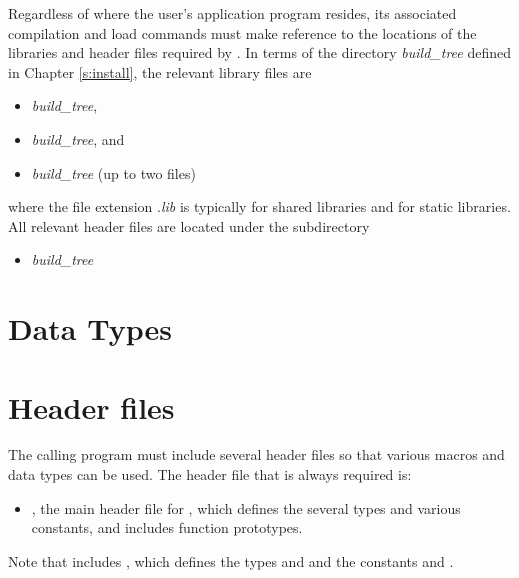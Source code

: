 Regardless of where the user's application program resides, its
associated compilation and load commands must make reference to the
locations of the libraries and header files required by
{\cvodes}.  In terms of the directory {\em build\_tree} defined in
Chapter \ref{s:install}, the relevant library files are
\begin{itemize}
\item {\em build\_tree},
\item {\em build\_tree}, and
\item {\em build\_tree} (up to two files)
\end{itemize}
where the file extension .{\em lib} is typically  for shared libraries
and  for static libraries. All relevant header files are located under
the subdirectory
\begin{itemize}
\item {\em build\_tree}
\end{itemize}

\section{Data Types}\label{s:types}


\section{Header files}\label{ss:header_sim}
The calling program must include several header files so that various macros
and data types can be used. The header file that is always required is:
\begin{itemize}
\item  {}, 
  the main header file for {\cvodes}, which defines the several
  types and various constants, and includes function prototypes.
\end{itemize}
Note that  includes , 
which defines the types  and 
and the constants  and .

